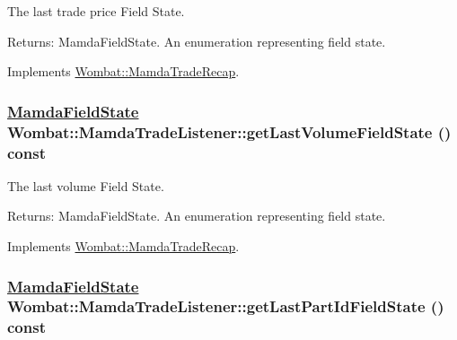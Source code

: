 The last trade price Field State. 

\begin{Desc}
\item[Returns:]Mamda\-Field\-State. An enumeration representing field state. \end{Desc}


Implements \hyperlink{classWombat_1_1MamdaTradeRecap_f4508406463e09aab15652b4b30b0bbc}{Wombat::Mamda\-Trade\-Recap}.\hypertarget{classWombat_1_1MamdaTradeListener_049bea66cd1715f50a3f894137810b30}{
\subsubsection[getLastVolumeFieldState]{\setlength{\rightskip}{0pt plus 5cm}\hyperlink{namespaceWombat_93aac974f2ab713554fd12a1fa3b7d2a}{Mamda\-Field\-State} Wombat::Mamda\-Trade\-Listener::get\-Last\-Volume\-Field\-State () const}}
\label{classWombat_1_1MamdaTradeListener_049bea66cd1715f50a3f894137810b30}


The last volume Field State. 

\begin{Desc}
\item[Returns:]Mamda\-Field\-State. An enumeration representing field state. \end{Desc}


Implements \hyperlink{classWombat_1_1MamdaTradeRecap_71887b4616edf5af0fccc2bae90a607c}{Wombat::Mamda\-Trade\-Recap}.\hypertarget{classWombat_1_1MamdaTradeListener_7ecf8dab22bff20d0f5b909d81f67dcb}{
\subsubsection[getLastPartIdFieldState]{\setlength{\rightskip}{0pt plus 5cm}\hyperlink{namespaceWombat_93aac974f2ab713554fd12a1fa3b7d2a}{Mamda\-Field\-State} Wombat::Mamda\-Trade\-Listener::get\-Last\-Part\-Id\-Field\-State () const}}
\label{classWombat_1_1MamdaTradeListener_7ecf8dab22bff20d0f5b909d81f67dcb}


